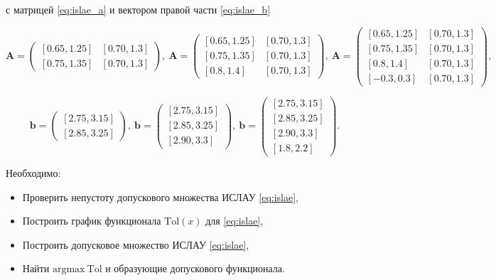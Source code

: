 \documentclass{article}
\begin{document}
  с матрицей \ref{eq:islae_a} и вектором правой части \ref{eq:islae_b}

  \begin{equation} \label{eq:islae_a}
    \mathbf{A} = \begin{pmatrix}
      [0.65, 1.25] & [0.70, 1.3] \\
      [0.75, 1.35] & [0.70, 1.3]
    \end{pmatrix},
    ~
    \mathbf{A} = \begin{pmatrix}
      [0.65, 1.25] & [0.70, 1.3] \\
      [0.75, 1.35] & [0.70, 1.3] \\
      [0.8, 1.4] & [0.70, 1.3]
    \end{pmatrix},
    ~
    \mathbf{A} = \begin{pmatrix}
      [0.65, 1.25] & [0.70, 1.3] \\
      [0.75, 1.35] & [0.70, 1.3] \\
      [0.8, 1.4] & [0.70, 1.3] \\
      [-0.3, 0.3] & [0.70, 1.3]
    \end{pmatrix},
  \end{equation}

  \begin{equation} \label{eq:islae_b}
    \mathbf{b} = \begin{pmatrix}
      [2.75, 3.15] \\
      [2.85, 3.25]
    \end{pmatrix},
    ~
    \mathbf{b} = \begin{pmatrix}
      [2.75, 3.15] \\
      [2.85, 3.25] \\
      [2.90, 3.3]
    \end{pmatrix},
    ~
    \mathbf{b} = \begin{pmatrix}
      [2.75, 3.15] \\
      [2.85, 3.25] \\
      [2.90, 3.3] \\
      [1.8, 2.2]
    \end{pmatrix}.
  \end{equation}

  Необходимо:

  \begin{itemize}
    \item Проверить непустоту допускового множества ИСЛАУ \ref{eq:islae},
    \item Построить график функционала \( \text{Tol}(x) \) для \ref{eq:islae},
    \item Построить допусковое множество ИСЛАУ \ref{eq:islae},
    \item Найти \( \text{argmax} \ \text{Tol} \) и образующие допускового
      функционала.
  \end{itemize}
\end{document}
